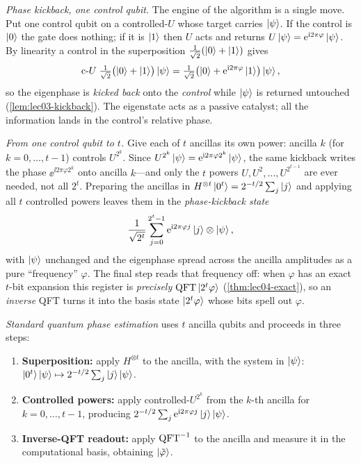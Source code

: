 \emph{Phase kickback, one control qubit.} The engine of the algorithm is a single
move. Put one control qubit on a controlled-$U$ whose target carries $\ket{\psi}$. If
the control is $\ket0$ the gate does nothing; if it is $\ket1$ then $U$ acts and
returns $U\ket{\psi}=\mathrm{e}^{\mathrm{i} 2\pi\varphi}\ket{\psi}$. By linearity a control in the
superposition $\tfrac1{\sqrt2}(\ket0+\ket1)$ gives
\[
  \text{c-}U\;\tfrac1{\sqrt2}\bigl(\ket0+\ket1\bigr)\ket{\psi}
   =\tfrac1{\sqrt2}\bigl(\ket0+\mathrm{e}^{\mathrm{i} 2\pi\varphi}\ket1\bigr)\ket{\psi},
\]
so the eigenphase is \emph{kicked back} onto the \emph{control} while $\ket{\psi}$ is
returned untouched (\cref{lem:lec03-kickback}). The eigenstate acts as a passive
catalyst; all the information lands in the control's relative phase.

\emph{From one control qubit to $t$.} Give each of $t$ ancillas its own power: ancilla
$k$ (for $k=0,\dots,t-1$) controls $U^{2^{k}}$. Since
$U^{2^{k}}\ket{\psi}=\mathrm{e}^{\mathrm{i} 2\pi\varphi 2^{k}}\ket{\psi}$, the same kickback writes
the phase $\ee^{\ii 2\pi\varphi 2^{k}}$ onto ancilla $k$---and only the $t$ powers
$U,U^{2},\dots,U^{2^{t-1}}$ are ever needed, not all $2^{t}$. Preparing the ancillas in
$H^{\otimes t}\ket{0^{t}}=2^{-t/2}\sum_{j}\ket{j}$ and applying all $t$ controlled
powers leaves them in the \emph{phase-kickback state}
\[
  \frac{1}{\sqrt{2^{t}}}\sum_{j=0}^{2^{t}-1}\mathrm{e}^{\mathrm{i} 2\pi\varphi j}\ket{j}
  \otimes\ket{\psi},
\]
with $\ket{\psi}$ unchanged and the eigenphase spread across the ancilla amplitudes as
a pure ``frequency'' $\varphi$. The final step reads that frequency off: when $\varphi$
has an exact $t$-bit expansion this register is \emph{precisely}
$\mathrm{QFT}\ket{2^{t}\varphi}$ (\cref{thm:lec04-exact}), so an \emph{inverse} QFT turns it
into the basis state $\ket{2^{t}\varphi}$ whose bits spell out $\varphi$.

\begin{definition}
\label{def:lec04-qpe}
\emph{Standard quantum phase estimation} uses $t$ ancilla qubits and proceeds in
three steps:
\begin{enumerate}[leftmargin=1.6em,nosep]
  \item \textbf{Superposition:} apply $H^{\otimes t}$ to the ancilla, with the
        system in $\ket{\psi}$: $\ket{0^{t}}\ket{\psi}\mapsto
        2^{-t/2}\sum_j\ket{j}\ket{\psi}$.
  \item \textbf{Controlled powers:} apply controlled-$U^{2^{k}}$ from the $k$-th
        ancilla for $k=0,\dots,t-1$, producing
        $2^{-t/2}\sum_j\mathrm{e}^{\mathrm{i} 2\pi\varphi j}\ket{j}\ket{\psi}$.
  \item \textbf{Inverse-QFT readout:} apply $\mathrm{QFT}^{-1}$ to the ancilla and measure
        it in the computational basis, obtaining $\ket{\tilde\varphi}$.
\end{enumerate}
\end{definition}

